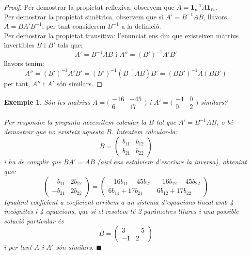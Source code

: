 \documentclass[
  11pt,
]{book}
\numberwithin{dummy}{section}
\theoremstyle{maincolornumbox}
\theoremstyle{blacknumex}
\newtheorem{exampleT}{Exemple}[chapter]
\theoremstyle{blacknumbox}
\theoremstyle{maincolornum}
\newenvironment{example}{\begin{exampleT}}{\hfill{\tiny\ensuremath{\blacksquare}}\end{exampleT}}
\newlength\esp
\begin{document}
\begin{proof}
Per demostrar la propietat reflexiva, observem que
\(A=\mathbf{1}_n^{-1} A \mathbf{1}_n\).\\
Per demostrar la propietat simètrica, observem que si \(A'=B^{-1}AB\),
llavors \(A=BA'B^{-1}\), per tant considerem \(B^{-1}\) a la definició.\\
Per demostrar la propietat transitiva: l'enunciat ens diu que existeixen
matrius invertibles \(B\) i \(B'\) tals que:
\[A'=B^{-1}AB \text{ i } A''=(B')^{-1}A'B'\] llavors tenim:
\[A''=(B')^{-1}A'B'=(B')^{-1}(B^{-1}AB)B'=(BB')^{-1}A(BB')\] per tant,
\(A''\) i \(A'\) són similars.
\end{proof}

\begin{example}
Són les matrius
\(A=\big(\begin{smallmatrix}  -16 & -45 \\ 6 & 17\end{smallmatrix}\big)\)
i \(A'=\big(\begin{smallmatrix} -1 & 0 \\ 0 & 2  \end{smallmatrix}\big)\)
similars?

Per respondre la pregunta necessitem calcular la \(B\) tal que
\(A'=B^{-1}AB\), o bé demostrar que no existeix aquesta \(B\). Intentem
calcular-la:
\[B=\begin{pmatrix} b_{11} & b_{12} \\ b_{21} & b_{22} \end{pmatrix}\] i
ha de complir que \(BA'=AB\) (així ens estalviem d'escriure la inversa),
obtenint que: \[\begin{pmatrix}
    -b_{11} & 2b_{12} \\ -b_{21} & 2b_{22}
    \end{pmatrix}
    =
    \begin{pmatrix}
    -16b_{11}-45b_{21} & -16b_{12}-45b_{22}\\ 6b_{11}+17b_{21} & 6b_{12}+17b_{22}
    \end{pmatrix}\] Igualant coeficient a coeficient arribem a un
sistema d'equacions lineal amb 4 incògnites i 4 equacions, que si el
resolem té 2 paràmetres lliures i una possible solució particular és
\[B=\begin{pmatrix}
    3 & -5 \\  -1 & 2 
    \end{pmatrix}\] i per tant \(A\) i \(A'\) són similars.
\end{example}
\end{document}
